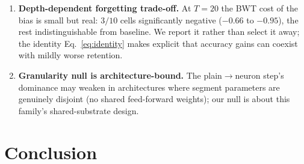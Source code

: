 \documentclass[review,12pt,number]{elsarticle}
\begin{document}
\begin{enumerate}
      trade-off", with the routing-restoration reading withdrawn.
      We also tested scheduled variants
      (Suppl.~S4): an annealed bias ($b_p = 10(1-p/T)$) retains
      $91$--$103\%$ of the constant-bias learning gain at $T{=}20$ but
      does not reliably remove the BWT cost (significant improvement in
      one of two datasets only), while a ramped bias ($b_p = 10p/(T{-}1)$)
      \emph{exceeds} the constant gain everywhere ($123$--$197\%$
      retention, $t \ge 2.6$) at an equally or more negative BWT cost.
      Scheduling moves along the retention--plasticity frontier ---
      tracking cumulative bias exposure, not timing --- but does not
      move the frontier itself; separating gain from cost appears to
      require a mechanism (e.g.\ task-staggered protection), not a
      schedule.
\item \textbf{Depth-dependent forgetting trade-off.} At $T{=}20$ the BWT
      cost of the bias is small but real: $3/10$ cells significantly
      negative ($-0.66$ to $-0.95$), the rest indistinguishable from
      baseline. We
      report it rather than select it away; the identity
      Eq.~\eqref{eq:identity} makes explicit that accuracy gains can
      coexist with mildly worse retention.
\item \textbf{Granularity null is architecture-bound.} The
      plain$\to$neuron step's dominance may weaken in architectures where
      segment parameters are genuinely disjoint (no shared feed-forward
      weights); our null is about this family's shared-substrate design.
\end{enumerate}

\section{Conclusion}
\label{sec:conclusion}
\end{document}
